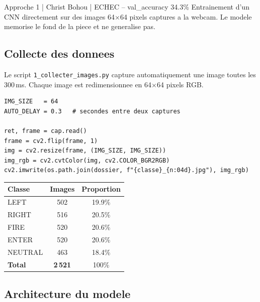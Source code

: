 \documentclass[12pt,a4paper]{article}
\begin{document}
\begin{approchebox}[BrickRed]{Approche 1 | Christ Bohou | ECHEC -- val\_accuracy 34.3\%}
Entrainement d'un CNN directement sur des images 64$\times$64 pixels
captures a la webcam. Le modele memorise le fond de la piece
et ne generalise pas.
\end{approchebox}

\subsection{Collecte des donnees}

Le script \texttt{1\_collecter\_images.py} capture automatiquement
une image toutes les 300\,ms. Chaque image est redimensionnee en 64$\times$64 pixels RGB.

\begin{lstlisting}[caption={Capture automatique d'images brutes.}]
IMG_SIZE   = 64
AUTO_DELAY = 0.3   # secondes entre deux captures

ret, frame = cap.read()
frame = cv2.flip(frame, 1)
img = cv2.resize(frame, (IMG_SIZE, IMG_SIZE))
img_rgb = cv2.cvtColor(img, cv2.COLOR_BGR2RGB)
cv2.imwrite(os.path.join(dossier, f"{classe}_{n:04d}.jpg"), img_rgb)
\end{lstlisting}

\begin{center}
\begin{tabular}{lcc}
\toprule
Classe & Images & Proportion \\
\midrule
LEFT    & 502  & 19.9\% \\
RIGHT   & 516  & 20.5\% \\
FIRE    & 520  & 20.6\% \\
ENTER   & 520  & 20.6\% \\
NEUTRAL & 463  & 18.4\% \\
\midrule
\textbf{Total} & \textbf{2\,521} & 100\% \\
\bottomrule
\end{tabular}
\end{center}

\subsection{Architecture du modele}
\end{document}
